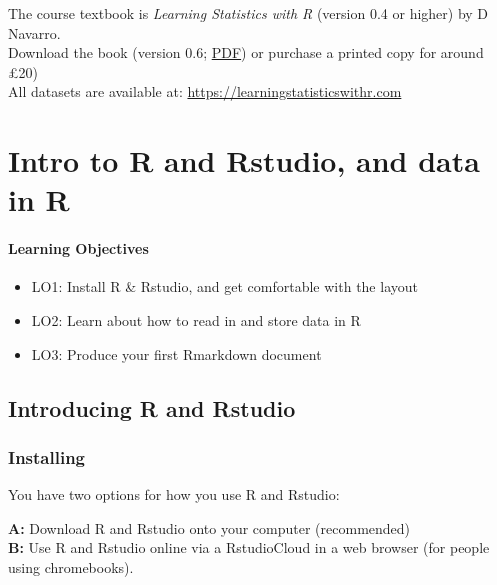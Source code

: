 \documentclass[]{book}
\providecommand{\tightlist}{%
  \setlength{\itemsep}{0pt}\setlength{\parskip}{0pt}}
\begin{document}
The course textbook is \emph{Learning Statistics with R} (version 0.4 or higher) by D Navarro.\\
Download the book (version 0.6; \href{https://learningstatisticswithr.com/lsr-0.6.pdf}{PDF}) or purchase a printed copy for around £20)\\
All datasets are available at: \url{https://learningstatisticswithr.com}

\hypertarget{chap-intro}{%
\chapter{Intro to R and Rstudio, and data in R}\label{chap-intro}}

\hypertarget{learning-objectives}{%
\subsubsection*{Learning Objectives}\label{learning-objectives}}

\begin{itemize}
\tightlist
\item
  LO1: Install R \& Rstudio, and get comfortable with the layout\\
\item
  LO2: Learn about how to read in and store data in R
\item
  LO3: Produce your first Rmarkdown document\\
\end{itemize}

\hypertarget{introducing-r-and-rstudio}{%
\section{Introducing R and Rstudio}\label{introducing-r-and-rstudio}}

\hypertarget{installing}{%
\subsection*{Installing}\label{installing}}

You have two options for how you use R and Rstudio:

\textbf{A:} Download R and Rstudio onto your computer (recommended)\\
\textbf{B:} Use R and Rstudio online via a RstudioCloud in a web browser (for people using chromebooks).
\end{document}
